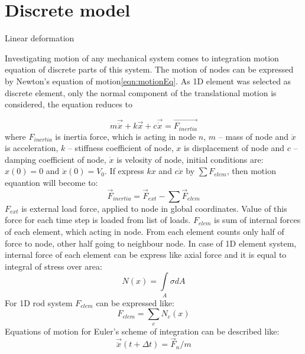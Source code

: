 \section*{Discrete model}
Linear deformation
~\par
Investigating motion of any mechanical system comes to integration motion equation of
discrete parts of this system. The motion of nodes can be expressed by Newton's equation of
motion\ref{eqn:motionEq}. As 1D element was selected as discrete element, only the normal 
component of the translational motion is considered, the equation reduces to\par
\begin{equation}\label{eqn:motionEq}
  m\vec{\ddot{x}} + k\vec{x} + c\vec{\dot{x}} = \vec{F_{inertia}}
\end{equation}
where $F_{inertia}$ is inertia force, which is acting in node $n$, $m$ – mass of node and $\ddot{x}$ is acceleration, $k$ –
stiffness coefficient of node, $x$ is displacement of node and $c$ – damping coefficient of node,
$\dot{x}$ is velosity of node, initial conditions are: $x(0)=0$ and $\dot{x}(0)=V_0$.
If express $kx$ and $c\dot{x}$ by $\sum{F_{elem}}$,  then motion equantion will become to:
\begin{equation}\label{eqn:sumF}
  \vec{F}_{inertia}= \vec{F}_{ext} - \sum\vec{F}_{elem}
\end{equation}
$F_{ext}$ is external load force, applied to node in global coordinates. Value of this force for
each time step is loaded from list of loads. $F_{elem}$ is sum of internal
forces of each element, which acting in node. From each element counts only half of force to node,
other half going to neighbour node. In case of 1D element system, internal force of each element can
be express like axial force and it is equal to integral of stress over area:
\begin{equation}\label{eqn:Nx}
  N(x)= \int\limits_A \sigma dA
\end{equation}
For 1D rod system $F_{elem}$ can be expressed like:
\begin{equation}\label{eqn:Felem}
  F_{elem} = \sum_{e}N_e(x)
\end{equation}
Equations of motion for Euler's scheme of integration can be described like:
\begin{equation}\label{eqn:Accel}
  \vec{\ddot{x}}(t +\Delta t)=\vec{F}_n/m
\end{equation}

